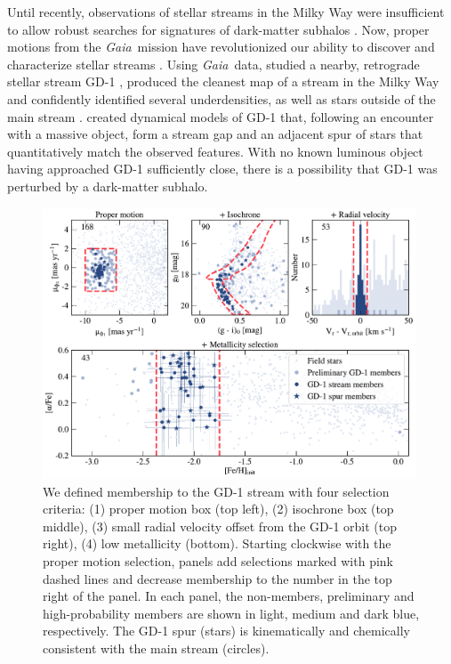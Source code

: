 \documentclass[twocolumn]{aastex63}
\newcommand{\gaia}{\textsl{Gaia}}
\begin{document}
Until recently, observations of stellar streams in the Milky Way were insufficient to allow robust searches for signatures of dark-matter subhalos \citep[cf.][]{carlberg2012, ibata2016}.
Now, proper motions from the \gaia\ mission \citep{gdr2} have revolutionized our ability to discover \citep[e.g.,][]{malhan2018,meingast2019} and characterize stellar streams \citep[e.g.,][]{bonaca2019b,shipp2019}.
Using \gaia\ data, \citet{pwb} studied a nearby, retrograde stellar stream GD-1 \citep{grillmair2006}, produced the cleanest map of a stream in the Milky Way and confidently identified several underdensities, as well as stars outside of the main stream \citep[see also][]{malhan2019b, deboer2019}.
\citet{bonaca2019a} created dynamical models of GD-1 that, following an encounter with a massive object, form a stream gap and an adjacent spur of stars that  quantitatively match the observed features.
With no known luminous object having approached GD-1 sufficiently close, there is a possibility that GD-1 was perturbed by a dark-matter subhalo.

\begin{figure}
\begin{center}
\includegraphics[width=0.99\textwidth]{members.pdf}
\end{center}
\caption{We defined membership to the GD-1 stream with four selection criteria: (1) proper motion box (top left), (2) isochrone box (top middle), (3) small radial velocity offset from the GD-1 orbit (top right), (4) low metallicity (bottom).
Starting clockwise with the proper motion selection, panels add selections marked with pink dashed lines and decrease membership to the number in the top right of the panel.
In each panel, the non-members, preliminary and high-probability members are shown in light, medium and dark blue, respectively.
The GD-1 spur (stars) is kinematically and chemically consistent with the main stream (circles).
}
\label{fig:members}
\end{figure}
\end{document}
